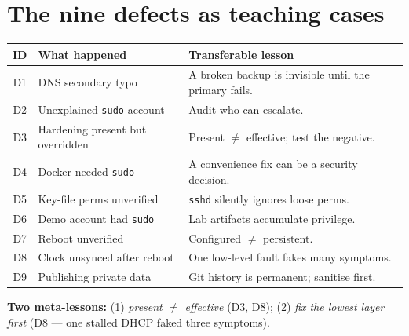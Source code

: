 \documentclass[11pt,a4paper]{article}
\begin{document}
\section{The nine defects as teaching cases}
\begin{longtable}{@{}cp{7.2cm}p{4.6cm}@{}}
\toprule \textbf{ID} & \textbf{What happened} & \textbf{Transferable lesson}\\ \midrule
D1 & DNS secondary typo & A broken backup is invisible until the primary fails.\\
D2 & Unexplained \texttt{sudo} account & Audit who can escalate.\\
D3 & Hardening present but overridden & Present $\ne$ effective; test the negative.\\
D4 & Docker needed \texttt{sudo} & A convenience fix can be a security decision.\\
D5 & Key-file perms unverified & \texttt{sshd} silently ignores loose perms.\\
D6 & Demo account had \texttt{sudo} & Lab artifacts accumulate privilege.\\
D7 & Reboot unverified & Configured $\ne$ persistent.\\
D8 & Clock unsynced after reboot & One low-level fault fakes many symptoms.\\
D9 & Publishing private data & Git history is permanent; sanitise first.\\
\bottomrule
\end{longtable}
\textbf{Two meta-lessons:} (1) \emph{present $\ne$ effective} (D3, D8); (2)
\emph{fix the lowest layer first} (D8 — one stalled DHCP faked three symptoms).

\end{document}
